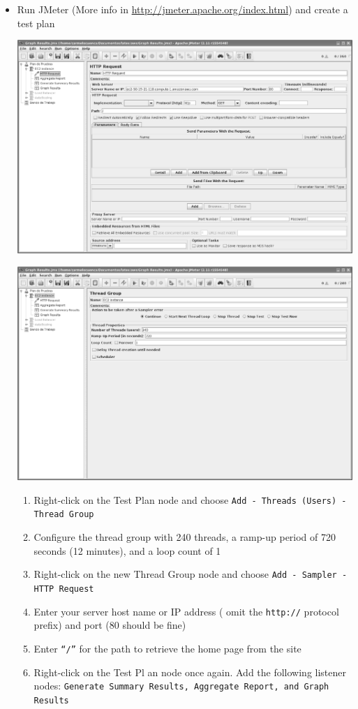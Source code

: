 \documentclass{beamer}
\begin{document}
\begin{frame}
\begin{itemize}
\item Run JMeter (More info in \url{http://jmeter.apache.org/index.html}) and create a test plan
\begin{center}
\includegraphics[scale=0.15]{plandeprueba.eps}
\end{center}
\begin{center}
\includegraphics[scale=0.15]{plandeprueba1.eps}
\end{center}

\begin{enumerate}
\item Right-click on the Test Plan node and choose \texttt{Add - Threads (Users) - Thread Group}
\item Configure the thread group with 240 threads, a ramp-up period of 720 seconds (12 minutes), and a loop count of 1
\item Right-click on the new Thread Group node and choose \texttt{Add - Sampler - HTTP Request}
\item Enter your server host name or IP address ( omit the \texttt{http://} protocol prefix) and port (80 should be fine)
\item Enter \texttt{``/''} for the path to retrieve the home page from the site
\item Right-click on the Test Pl an node once again. Add the following listener nodes: \texttt{Generate Summary Results, Aggregate Report, and Graph Results}


\end{enumerate}
\end{itemize}
\end{frame}
\end{document}
